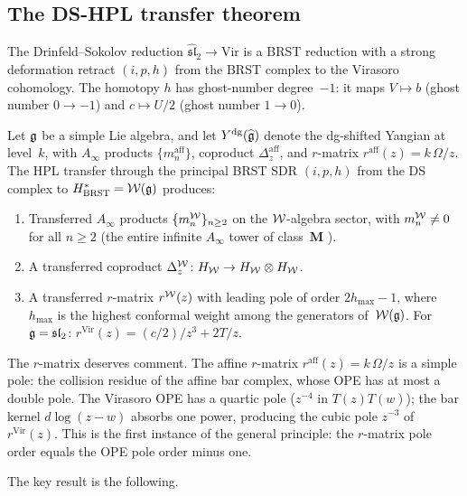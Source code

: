 \subsection{The DS-HPL transfer theorem}
\label{subsec:ds-hpl}

The Drinfeld--Sokolov reduction $\hat{\mathfrak{sl}}_2 \to
\mathrm{Vir}$ is a BRST reduction with a strong deformation retract
$(i, p, h)$ from the BRST complex to the Virasoro cohomology.
The homotopy $h$ has ghost-number degree~$-1$: it maps
$V \mapsto b$ (ghost number $0 \to -1$) and
$c \mapsto U/2$ (ghost number $1 \to 0$).

\begin{theorem}\label{thm:ds-hpl-standalone}
Let $\mathfrak{g}$ be a simple Lie algebra, and let
$Y^{\mathrm{dg}}(\widehat{\mathfrak{g}})$ denote the dg-shifted
Yangian at level~$k$, with $A_\infty$ products
$\{m_n^{\mathrm{aff}}\}$, coproduct
$\Delta_z^{\mathrm{aff}}$, and $r$-matrix
$r^{\mathrm{aff}}(z) = k\,\Omega/z$. The HPL transfer through the
principal BRST SDR $(i, p, h)$ from the DS complex to
$H^*_{\mathrm{BRST}} = \mathcal{W}(\mathfrak{g})$ produces:
\begin{enumerate}[label=\textup{(\roman*)}]
\item Transferred $A_\infty$ products
 $\{m_n^{\mathcal{W}}\}_{n \geq 2}$ on the $\mathcal{W}$-algebra sector,
 with $m_n^{\mathcal{W}} \neq 0$ for all $n \geq 2$
 \textup{(}the entire infinite $A_\infty$ tower of class~$\mathbf{M}$%
 \textup{)}.
\item A transferred coproduct
 $\Delta_z^{\mathcal{W}} \colon H_{\mathcal{W}} \to
 H_{\mathcal{W}} \otimes H_{\mathcal{W}}$.
\item A transferred $r$-matrix
 $r^{\mathcal{W}}(z)$ with leading pole of order
 $2h_{\max} - 1$, where $h_{\max}$ is the highest conformal
 weight among the generators of~$\mathcal{W}(\mathfrak{g})$.
 For $\mathfrak{g} = \mathfrak{sl}_2$:
 $r^{\mathrm{Vir}}(z) = (c/2)/z^3 + 2T/z$.
\end{enumerate}
\end{theorem}

The $r$-matrix deserves comment. The affine $r$-matrix
$r^{\mathrm{aff}}(z) = k\,\Omega/z$ is a simple pole: the
collision residue of the affine bar complex, whose OPE has at most
a double pole. The Virasoro OPE has a quartic pole
($z^{-4}$ in $T(z)T(w)$); the bar kernel $d\!\log(z-w)$ absorbs
one power, producing the cubic pole $z^{-3}$ of
$r^{\mathrm{Vir}}(z)$. This is the first instance of the general
principle: the $r$-matrix pole order equals the OPE pole order
minus one.

The key result is the following.

